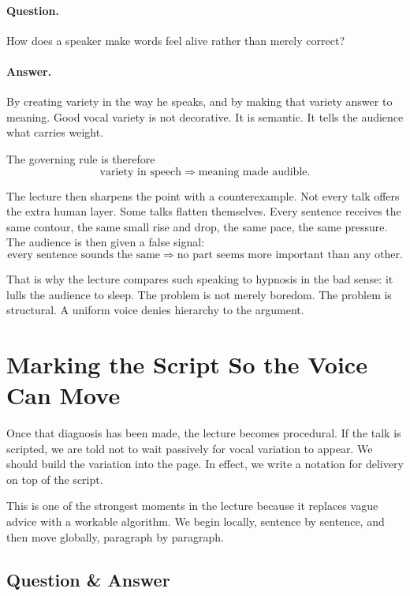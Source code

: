 \paragraph{Question.} How does a speaker make words feel alive rather than merely correct?

\paragraph{Answer.} By creating variety in the way he speaks, and by making that variety answer to meaning. Good vocal variety is not decorative. It is semantic. It tells the audience what carries weight.

The governing rule is therefore
\begin{equation}
\text{variety in speech} \Longrightarrow \text{meaning made audible}.
\end{equation}

The lecture then sharpens the point with a counterexample. Not every talk offers the extra human layer. Some talks flatten themselves. Every sentence receives the same contour, the same small rise and drop, the same pace, the same pressure. The audience is then given a false signal:
\begin{equation}
\text{every sentence sounds the same} \Longrightarrow \text{no part seems more important than any other}.
\end{equation}

That is why the lecture compares such speaking to hypnosis in the bad sense: it lulls the audience to sleep. The problem is not merely boredom. The problem is structural. A uniform voice denies hierarchy to the argument.

\section{Marking the Script So the Voice Can Move}

Once that diagnosis has been made, the lecture becomes procedural. If the talk is scripted, we are told not to wait passively for vocal variation to appear. We should build the variation into the page. In effect, we write a notation for delivery on top of the script.

This is one of the strongest moments in the lecture because it replaces vague advice with a workable algorithm. We begin locally, sentence by sentence, and then move globally, paragraph by paragraph.

\subsection{Question \& Answer}

